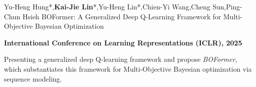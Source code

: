 

\begin{cventries}


  \cventry
  {Yu-Heng Hung*,\textbf{Kai-Jie Lin}*,Yu-Heng Lin*,Chien-Yi Wang,Cheng Sun,Ping-Chun Hsieh} %
  {BOFormer: A Generalized Deep Q-Learning Framework for Multi-Objective Bayesian Optimization} %
  {} %
  {} %
  {
    \begin{cvitems} %
      \item {\textbf{International Conference on Learning Representations (ICLR), 2025}}
      \item {Presenting a generalized deep Q-learning framework and propose \textit{BOFormer}, which substantiates this framework for Multi-Objective Bayesian optimization via sequence modeling.}
    \end{cvitems}
  }
  

\end{cventries}

